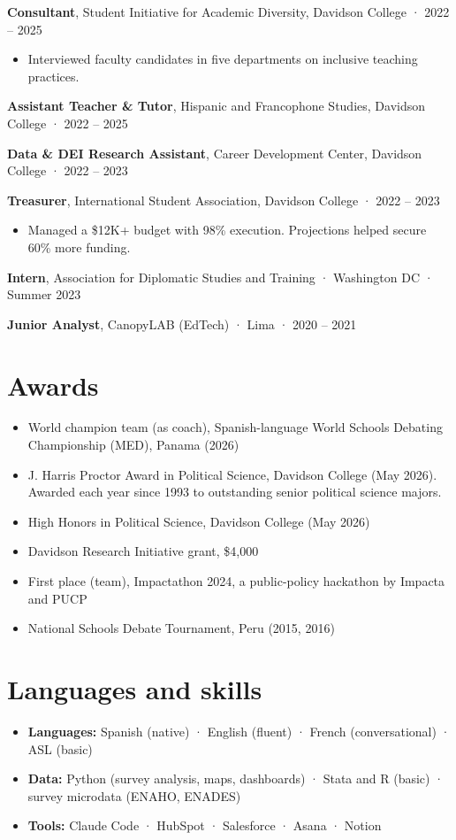 \documentclass[10pt,a4paper]{article}
\begin{document}
\smallskip
\textbf{Consultant}, Student Initiative for Academic Diversity, Davidson College · 2022 – 2025\par
\begin{itemize}
\item Interviewed faculty candidates in five departments on inclusive teaching practices.
\end{itemize}
\smallskip
\textbf{Assistant Teacher \& Tutor}, Hispanic and Francophone Studies, Davidson College · 2022 – 2025\par
\smallskip
\textbf{Data \& DEI Research Assistant}, Career Development Center, Davidson College · 2022 – 2023\par
\smallskip
\textbf{Treasurer}, International Student Association, Davidson College · 2022 – 2023\par
\begin{itemize}
\item Managed a \$12K+ budget with 98\% execution. Projections helped secure 60\% more funding.
\end{itemize}
\smallskip
\textbf{Intern}, Association for Diplomatic Studies and Training · Washington DC · Summer 2023\par
\smallskip
\textbf{Junior Analyst}, CanopyLAB (EdTech) · Lima · 2020 – 2021\par
\section*{Awards}
\begin{itemize}
\item World champion team (as coach), Spanish-language World Schools Debating Championship (MED), Panama (2026)
\item J. Harris Proctor Award in Political Science, Davidson College (May 2026). Awarded each year since 1993 to outstanding senior political science majors.
\item High Honors in Political Science, Davidson College (May 2026)
\item Davidson Research Initiative grant, \$4,000
\item First place (team), Impactathon 2024, a public-policy hackathon by Impacta and PUCP
\item National Schools Debate Tournament, Peru (2015, 2016)
\end{itemize}
\section*{Languages and skills}
\begin{itemize}
\item \textbf{Languages:} Spanish (native) · English (fluent) · French (conversational) · ASL (basic)
\item \textbf{Data:} Python (survey analysis, maps, dashboards) · Stata and R (basic) · survey microdata (ENAHO, ENADES)
\item \textbf{Tools:} Claude Code · HubSpot · Salesforce · Asana · Notion
\end{itemize}
\end{document}

